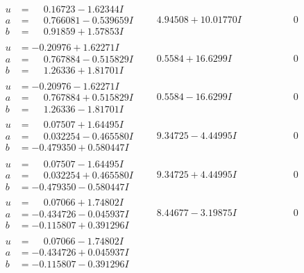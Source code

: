 \documentclass[1p]{elsarticle_modified}
\theoremstyle{definition}
\begin{document}
$$\begin{array}{c|c|c}
\begin{aligned}
u &= \phantom{-}0.16723 - 1.62344 I \\
a &= \phantom{-}0.766081 - 0.539659 I \\
b &= \phantom{-}0.91859 + 1.57853 I\end{aligned}
 & \phantom{-}4.94508 + 10.01770 I & \phantom{-0.000000 } 0 \\ \hline\begin{aligned}
u &= -0.20976 + 1.62271 I \\
a &= \phantom{-}0.767884 - 0.515829 I \\
b &= \phantom{-}1.26336 + 1.81701 I\end{aligned}
 & \phantom{-}0.5584 + 16.6299 I & \phantom{-0.000000 } 0 \\ \hline\begin{aligned}
u &= -0.20976 - 1.62271 I \\
a &= \phantom{-}0.767884 + 0.515829 I \\
b &= \phantom{-}1.26336 - 1.81701 I\end{aligned}
 & \phantom{-}0.5584 - 16.6299 I & \phantom{-0.000000 } 0 \\ \hline\begin{aligned}
u &= \phantom{-}0.07507 + 1.64495 I \\
a &= \phantom{-}0.032254 - 0.465580 I \\
b &= -0.479350 + 0.580447 I\end{aligned}
 & \phantom{-}9.34725 - 4.44995 I & \phantom{-0.000000 } 0 \\ \hline\begin{aligned}
u &= \phantom{-}0.07507 - 1.64495 I \\
a &= \phantom{-}0.032254 + 0.465580 I \\
b &= -0.479350 - 0.580447 I\end{aligned}
 & \phantom{-}9.34725 + 4.44995 I & \phantom{-0.000000 } 0 \\ \hline\begin{aligned}
u &= \phantom{-}0.07066 + 1.74802 I \\
a &= -0.434726 - 0.045937 I \\
b &= -0.115807 + 0.391296 I\end{aligned}
 & \phantom{-}8.44677 - 3.19875 I & \phantom{-0.000000 } 0 \\ \hline\begin{aligned}
u &= \phantom{-}0.07066 - 1.74802 I \\
a &= -0.434726 + 0.045937 I \\
b &= -0.115807 - 0.391296 I\end{aligned}

\end{array}$$
\end{document}

